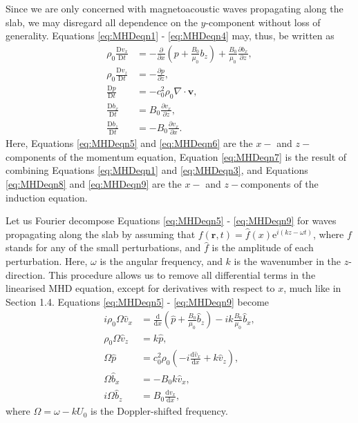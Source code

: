 \documentclass[12pt]{ociamthesis}
\begin{document}
Since we are only concerned with magnetoacoustic waves propagating along the slab, we may disregard all dependence on the $y$-component without loss of generality. 
Equations \eqref{eq:MHDeqn1} - \eqref{eq:MHDeqn4} may, thus, be written as
\begin{align}
\label{eq:MHDeqn5}
\rho_0 \frac{\mathrm{D} v_x}{\mathrm{D} t}
& = - \frac{\partial}{\partial x} \left(p + \frac{B_0}{\mu_0} b_z \right)
+ \frac{B_0}{\mu_0} \frac{\partial b_x}{\partial z},
\\[0.3cm]
\label{eq:MHDeqn6}
\rho_0 \frac{\mathrm{D} v_z}{\mathrm{D} t}
& = - \frac{\partial p}{\partial z},
\\[0.3cm]
\label{eq:MHDeqn7}
\frac{\mathrm{D} p}{\mathrm{D} t} &
= - c_0^2 \rho_0 \nabla \cdot \mathbf{v},
\\[0.3cm]
\label{eq:MHDeqn8}
\frac{\mathrm{D} b_x}{\mathrm{D} t}
& = B_0 \frac{\partial v_x}{\partial z},
\\[0.3cm]
\label{eq:MHDeqn9}
\frac{\mathrm{D} b_z}{\mathrm{D} t}
& = - B_0 \frac{\partial v_x}{\partial x}.
\end{align}
Here, Equations \eqref{eq:MHDeqn5} and \eqref{eq:MHDeqn6} are the $x-$ and $z-$components of the momentum equation, Equation \eqref{eq:MHDeqn7} is the result of combining Equations \eqref{eq:MHDeqn1} and \eqref{eq:MHDeqn3}, and Equations \eqref{eq:MHDeqn8} and \eqref{eq:MHDeqn9} are the $x-$ and $z-$components of the induction equation.

Let us Fourier decompose Equations \eqref{eq:MHDeqn5} - \eqref{eq:MHDeqn9} for waves propagating along the slab by assuming that $f(\mathbf{r}, t) = \hat{f}(x) \mathrm{e}^{i(k z - \omega t)}$, where $f$ stands for any of the small perturbations, and $\hat{f}$ is the amplitude of each perturbation.
Here, $\omega$ is the angular frequency, and $k$ is the wavenumber in the $z$-direction.
This procedure allows us to remove all differential terms in the linearised MHD equation, except for derivatives with respect to $x$, much like in Section 1.4.
Equations \eqref{eq:MHDeqn5} - \eqref{eq:MHDeqn9} become
\begin{align}
\label{eq:MHDeqn10}
i \rho_0 \Omega \hat v_x
& = \frac{\mathrm{d}}{\mathrm{d} x} \left(\hat p + \frac{B_0}{\mu_0} \hat b_z \right)
- ik \frac{B_0}{\mu_0} \hat b_x,
\\[0.3cm]
\label{eq:MHDeqn11}
\rho_0 \Omega \hat v_z
& = k \hat p,
\\[0.3cm]
\label{eq:MHDeqn12}
\Omega \hat p
& = c_0^2 \rho_0 (- i \frac{\mathrm{d} \hat v_x}{\mathrm{d} x} + k \hat v_z),
\\[0.3cm]
\label{eq:MHDeqn13}
\Omega \hat b_x
& = - B_0 k \hat v_x,
\\[0.3cm]
\label{eq:MHDeqn14}
i \Omega \hat b_z
& = B_0 \frac{\mathrm{d} \hat v_x}{\mathrm{d} x},
\end{align}
where $\Omega = \omega - k U_0$ is the Doppler-shifted frequency.
\end{document}
